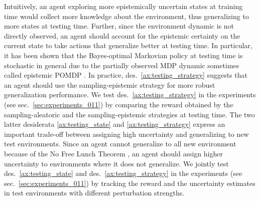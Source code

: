 Intuitively, an agent exploring more epistemically uncertain states at training time would collect more knowledge about the environment, thus generalizing to more states at testing time. Further, since the environment dynamic is not directly observed, an agent should account for the epistemic certainty on the current state to take actions that generalize better at testing time. In particular, it has been shown that the Bayes-optimal Markovian policy at testing time is stochastic in general due to the partially observed MDP dynamic sometimes called epistemic POMDP \cite{epistemic-pomdp}. In practice, des.~\ref{ax:testing_strategy} suggests that an agent should use the sampling-epistemic strategy for more robust generalization performance. We test des.~\ref{ax:testing_strategy} in the experiments (see sec.~\ref{sec:experiments_011}) by comparing the reward obtained by the sampling-aleatoric and the sampling-epistemic strategies at testing time. The two latter desiderata \ref{ax:testing_state} and \ref{ax:testing_strategy} express an important trade-off between assigning high uncertainty and generalizing to new test environments. Since an agent cannot generalize to all new environment because of the No Free Lunch Theorem \cite{no-free-lunch-theorem-optimization}, an agent should assign higher uncertainty to environments where it does not generalize. We jointly test des.~\ref{ax:testing_state} and des.~\ref{ax:testing_strategy} in the experiments (see sec.~\ref{sec:experiments_011}) by tracking the reward and the uncertainty estimates in test environments with different perturbation strengths.
